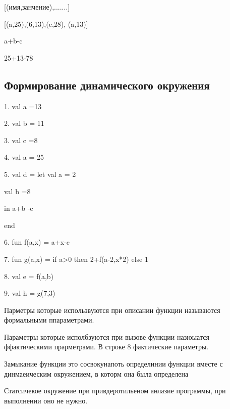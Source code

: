 \documentclass{article}
\begin{document}
[(имя,занчение),.......]

[(a,25),(6,13),(c,28), (a,13)]

a+b-c

25+13-78

\subsection{Формирование динамического окружения}

1. val a =13

2. val b = 11

3. val c =8

4. val a = 25

5. val d = let val a = 2

\hspace{15mm} val b =8 

\hspace{15mm}  in a+b -c

\hspace{15mm}  end

6. fun f(a,x) = a+x-c 

7. fun g(a,x) = if a>0 then 2+f(a-2,x*2) else 1

8. val e = f(a,b)

9. val h = g(7,3)


Парметры которые использвуются при описании функции называются формальными ппараметрами.

Параметры которые исполбзуются при вызове функции назюыатся ффактическими прарметрами. В строке 
8 фактические параметры. 

Замыкание функции это сосвокунапоть определинии функции вместе с динмаеическим окружением, в которм 
она была определена

Статсичекое окружение при привдеротильеном анлазие программы, при выполнении оно не нужно.
\end{document}
